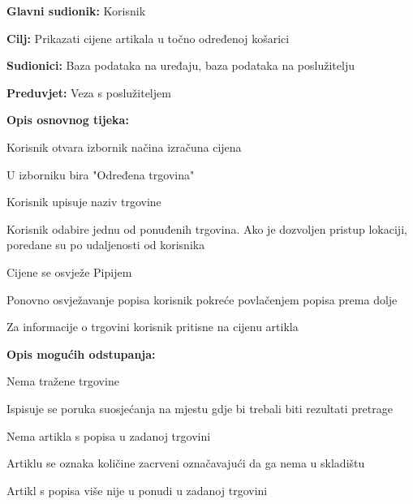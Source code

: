				
				\noindent {}
				\begin{packed_item}
					\item \textbf{Glavni sudionik:} Korisnik
					\item  \textbf{Cilj:} Prikazati cijene artikala u točno određenoj košarici
					\item  \textbf{Sudionici:} Baza podataka na uređaju, baza podataka na poslužitelju
					\item  \textbf{Preduvjet:} Veza s poslužiteljem
					\item  \textbf{Opis osnovnog tijeka:}
					\item[] \begin{packed_enum}
						\item Korisnik otvara izbornik načina izračuna cijena
						\item U izborniku bira "Određena trgovina"
						\item Korisnik upisuje naziv trgovine
						\item Korisnik odabire jednu od ponuđenih trgovina. Ako je dozvoljen pristup lokaciji, poredane su po udaljenosti od korisnika
						\item Cijene se osvježe Pipijem
						\item Ponovno osvježavanje popisa korisnik pokreće povlačenjem popisa prema dolje
						\item Za informacije o trgovini korisnik pritisne na cijenu artikla
					\end{packed_enum}
					\item  \textbf{Opis mogućih odstupanja:}
					\item[] \begin{packed_item}
						\item[4.a] Nema tražene trgovine
						\item[] \begin{packed_enum}
							\item Ispisuje se poruka suosjećanja na mjestu gdje bi trebali biti rezultati pretrage
						\end{packed_enum}
						\item[5.a] Nema artikla s popisa u zadanoj trgovini
						\item[] \begin{packed_enum}
							\item Artiklu se oznaka količine zacrveni označavajući da ga nema u skladištu
						\end{packed_enum}
						\item[6.a] Artikl s popisa više nije u ponudi u zadanoj trgovini

\end{packed_item}
\end{packed_item}
